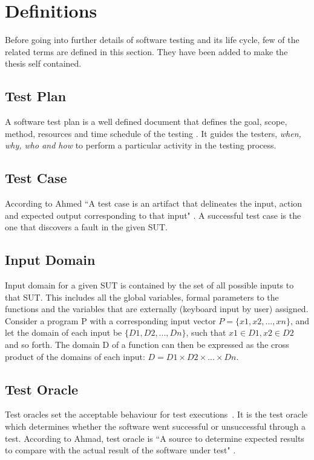 \section{Definitions}
Before going into further details of software testing and its life cycle, few of the related terms are defined in this section. They have been added to make the thesis self contained.

\subsection{Test Plan}
A software test plan is a well defined document that defines the goal, scope, method, resources and time schedule of the testing \cite{futrell2001quality}. It guides the testers, {\it {when, why, who and how}} to perform a particular activity in the testing process. 

\subsection{Test Case}
According to Ahmed ``A test case is an artifact that delineates the input, action and expected output corresponding to that input" \cite{ahmed2010software}. A successful test case is the one that discovers a fault in the given SUT.

\subsection{Input Domain} 
Input domain for a given SUT is contained by the set of all possible inputs to that SUT. This includes all the global variables, formal parameters to the functions and the variables that are externally (keyboard input by user) assigned. Consider a program P with a corresponding input vector $ P =\{x1, x2, . . . , xn\}$, and let the domain of each input be $\{D1, D2, . . . , Dn\}$, such that $x1 \in D1,x2 \in D2$ and so forth. The domain D of a function can then be expressed as the cross product of the domains of each input: $D = D1×D2×. . .×Dn$.

\subsection{Test Oracle}
Test oracles set the acceptable behaviour for test executions~\cite{baresi2001test}. It is the test oracle which determines whether the software went successful or unsuccessful through a test. According to Ahmad, test oracle is ``A source to determine expected results to compare with the actual result of the software under test" \cite{ahmed2010software}.

